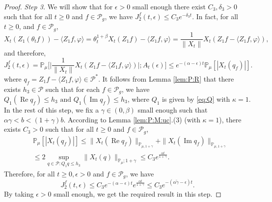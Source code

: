 \documentclass[EJP]{ejpecp} %
\begin{document}
\begin{proof}
	\emph{Step 3.} We will show that for $\epsilon>0$ small enough there exist $C_3, \delta_3 > 0$ such that for all $t \geq 0$ and $f\in \mathcal P_g$,  we have $ J^f_2(t,\epsilon) \leq C_3 e^{-\delta_3 t}$.
	In fact, for all $t\geq 0$, and $f\in \mathcal P_g$,
\[
	X_{t}(Z_1(\theta_t f))- \langle Z_1f, \varphi\rangle
   	= \theta_t^{1+\beta} X_t(Z_1 f) - \langle  Z_1 f,\varphi \rangle
   	= \frac{1}{\|X_{t}\|}X_t(Z_1f - \langle  Z_1 f ,\varphi \rangle),
\]
	and therefore,
\begin{equation}
\label{eq: prevJ2}
	J^f_2(t,\epsilon)
	= \mathbb P_\mu\Big[\Big|  \frac{1}{\|X_{t}\|}X_t(Z_1f - \langle  Z_1 f ,\varphi \rangle) \Big|;A_t(\epsilon)\Big]
    \leq e^{-(\alpha-\epsilon)t} \mathbb{P}_{\mu}[|X_t (q_f) |].
\end{equation}
	where $ q_f = Z_1 f-\langle  Z_1 f,\varphi\rangle \in \mathcal P^*$.
	It follows from Lemma \ref{lem:P:R} that there exists $h_{3}\in \mathcal{P}$ such that for each $ f\in \mathcal P_g$, we have $Q_1 (\operatorname{Re} q_f) \leq h_{3} \text{ and } Q_1 (\operatorname{Im} q_f)\leq h_3$, where $Q_1$ is given by \eqref{eq:Q} with $\kappa=1$.
	In the rest of this step, we  fix a $\gamma\in(0,\beta)$ small enough such that $\alpha \gamma < b < (1+\gamma)b$.
	According to Lemma \ref{lem:P:M:uc}.(3) (with $\kappa=1$), there exists $C_{3}>0$ such that for all $t\geq 0$ and $f\in \mathcal P_g$,
\begin{align}
	& \mathbb{P}_{\mu}\left[\left|X_{t}(q_f)\right|\right]
    \leq \| X_{t}( \operatorname{Re} q_f)\|_{\mathbb{P}_{\mu,1+\gamma}} + \| X_{t}(\operatorname{Im} q_f)\|_{\mathbb{P}_{\mu,1+\gamma}} \\
	& \leq 2\sup_{q\in \mathcal P: Q_1 q\leq h_{3}} \|X_t(q)\|_{\mathbb P_\mu; 1+\gamma} \leq C_{3} e^{\frac{\alpha t}{1+\gamma}}.
\end{align}
	Therefore, for all $t\geq 0, \epsilon > 0$ and $f \in \mathcal P_g$, we have
\begin{equation}
	\label{eq: right bound for J2}
	J^f_2(t, \epsilon)
    \leq  C_3 e^{-(\alpha-\epsilon)t}e^{\frac{\alpha t}{1+\gamma}}
   	\leq C_{3} e^{-(\alpha\tilde \gamma -\epsilon)t}.
\end{equation}
	By taking $\epsilon >0$ small enough, we get the required result in this step.


\end{proof}
\end{document}
